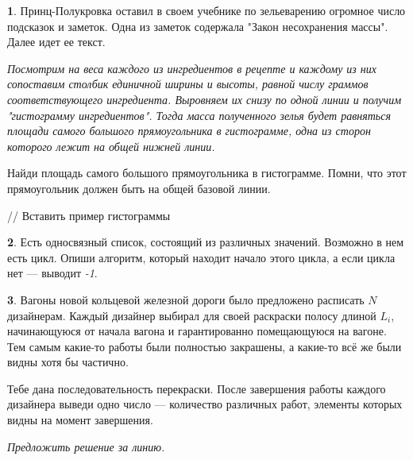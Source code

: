 \documentclass[14pt, a4paper]{extarticle}
\theoremstyle{definition}
\newtheorem{problem}{}
\theoremstyle{definition}
\theoremstyle{remark}
\numberwithin{equation}{section}
\begin{document}
\begin{problem}
    Принц-Полукровка оставил в своем учебнике по зельеварению 
    огромное число подсказок и заметок. Одна из заметок содержала 
    "Закон несохранения массы". Далее идет ее текст.

    \textit{Посмотрим на веса каждого из ингредиентов в рецепте и 
    каждому из них сопоставим столбик единичной ширины и высоты, 
    равной числу граммов соответствующего ингредиента. 
    Выровняем их снизу по одной линии и получим "гистограмму 
    ингредиентов". Тогда масса полученного зелья будет равняться 
    площади самого большого прямоугольника в гистограмме, одна 
    из сторон которого лежит на общей нижней линии.}

    Найди площадь самого большого прямоугольника в гистограмме. 
    Помни, что этот прямоугольник должен быть на общей базовой линии.

    // Вставить пример гистограммы
\end{problem}

\begin{problem}
    Есть односвязный список, состоящий из различных значений. 
    Возможно в нем есть цикл. Опиши алгоритм, который находит
    начало этого цикла, а если цикла нет --- выводит \textit{-1}.

\end{problem}

\begin{problem}
    Вагоны новой кольцевой железной дороги было предложено расписать 
    $N$ дизайнерам. Каждый дизайнер выбирал для своей раскраски полосу 
    длиной $L_i$, начинающуюся от начала вагона и гарантированно 
    помещающуюся на вагоне. Тем самым какие-то работы были полностью 
    закрашены, а какие-то всё же были видны хотя бы частично.

    Тебе дана последовательность перекраски. После завершения работы 
    каждого дизайнера выведи одно число — количество различных работ, 
    элементы которых видны на момент завершения.

    \textit{Предложить решение за линию.}
\end{problem}
\end{document}
